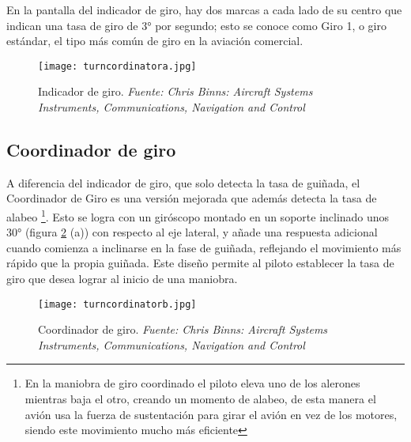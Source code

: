 En la pantalla del indicador de giro, hay dos marcas a cada lado de su centro que indican una tasa de giro de 3° por segundo; esto se conoce como Giro 1, o giro estándar, el tipo más común de giro en la aviación comercial.\\

\begin{figure}[H]
    \centering
    \texttt{[image: turncordinatora.jpg]}
    \caption{\centering Indicador de giro.\textit{ Fuente: Chris Binns: Aircraft Systems Instruments, Communications, Navigation and Control}}
    \label{fig:indicadordegiro}
\end{figure}

\subsection{Coordinador de giro}
A diferencia del indicador de giro, que solo detecta la tasa de guiñada, el Coordinador de Giro es una versión mejorada que además detecta la tasa de alabeo \footnote{En la maniobra de giro coordinado el piloto eleva uno de los alerones mientras baja el otro, creando un momento de alabeo, de esta manera el avión usa la fuerza de sustentación para girar el avión en vez de los motores, siendo este movimiento mucho más eficiente}. Esto se logra con un giróscopo montado en un soporte inclinado unos 30° (figura \ref{fig:indicadordegiroguapo} (a)) con respecto al eje lateral, y añade una respuesta adicional cuando comienza a inclinarse en la fase de guiñada, reflejando el movimiento más rápido que la propia guiñada. Este diseño permite al piloto establecer la tasa de giro que desea lograr al inicio de una maniobra.\\

\begin{figure}[H]
    \centering
    \texttt{[image: turncordinatorb.jpg]}
    \caption{\centering Coordinador de giro.\textit{ Fuente: Chris Binns: Aircraft Systems Instruments, Communications, Navigation and Control}}
    \label{fig:indicadordegiroguapo}
\end{figure}

